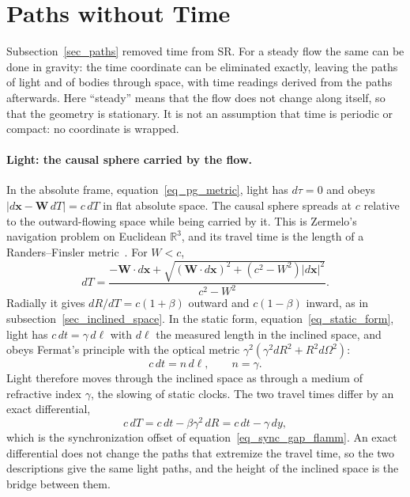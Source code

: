 \documentclass{iopjournal}
\begin{document}
\section{Paths without Time}\label{sec_time_elimination}

Subsection~\ref{sec_paths} removed time from SR. For a steady flow the same can be done in gravity: the time coordinate can be eliminated exactly, leaving the paths of light and of bodies through space, with time readings derived from the paths afterwards. Here ``steady'' means that the flow does not change along itself, so that the geometry is stationary. It is not an assumption that time is periodic or compact: no coordinate is wrapped.

\paragraph{Light: the causal sphere carried by the flow.} In the absolute frame, equation~\eqref{eq_pg_metric}, light has $d\tau=0$ and obeys $|d\mathbf{x}-\mathbf{W}\,dT|=c\,dT$ in flat absolute space. The causal sphere spreads at $c$ relative to the outward-flowing space while being carried by it. This is Zermelo's navigation problem on Euclidean $\mathbb{R}^3$, and its travel time is the length of a Randers--Finsler metric~\cite{GibbonsZermelo2009}. For $W<c$,
\begin{equation}\label{eq_zermelo_time}
    dT=\frac{-\mathbf{W}\cdot d\mathbf{x}+\sqrt{\left(\mathbf{W}\cdot d\mathbf{x}\right)^2+\left(c^2-W^2\right)|d\mathbf{x}|^2}}{c^2-W^2}.
\end{equation}
Radially it gives $dR/dT=c(1+\beta)$ outward and $c(1-\beta)$ inward, as in subsection~\ref{sec_inclined_space}. In the static form, equation~\eqref{eq_static_form}, light has $c\,dt=\gamma\,d\ell$ with $d\ell$ the measured length in the inclined space, and obeys Fermat's principle with the optical metric $\gamma^2\left(\gamma^2dR^2+R^2d\Omega^2\right)$:
\begin{equation}\label{eq_optical_index}
    c\,dt=n\,d\ell,
    \qquad
    n=\gamma .
\end{equation}
Light therefore moves through the inclined space as through a medium of refractive index $\gamma$, the slowing of static clocks. The two travel times differ by an exact differential,
\begin{equation}\label{eq_randers_fermat}
    c\,dT=c\,dt-\beta\gamma^2\,dR=c\,dt-\gamma\,dy ,
\end{equation}
which is the synchronization offset of equation~\eqref{eq_sync_gap_flamm}. An exact differential does not change the paths that extremize the travel time, so the two descriptions give the same light paths, and the height of the inclined space is the bridge between them.
\end{document}
